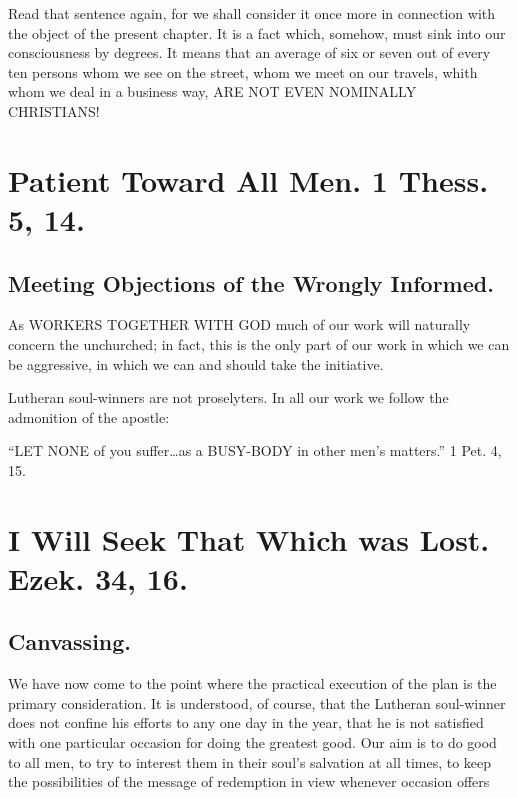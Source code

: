 \documentclass[
]{book}
\begin{document}
Read that sentence again, for we shall consider it once more in connection with the object of the present chapter. It is a fact which, somehow, must sink into our consciousness by degrees. It means that an average of six or seven out of every ten persons whom we see on the street, whom we meet on our travels, whith whom we deal in a business way, ARE NOT EVEN NOMINALLY CHRISTIANS!

\hypertarget{patient-toward-all-men.-1-thess.-5-14.}{%
\chapter{Patient Toward All Men. 1 Thess. 5, 14.}\label{patient-toward-all-men.-1-thess.-5-14.}}

\hypertarget{meeting-objections-of-the-wrongly-informed.}{%
\section*{Meeting Objections of the Wrongly Informed.}\label{meeting-objections-of-the-wrongly-informed.}}

As WORKERS TOGETHER WITH GOD much of our work will naturally concern the unchurched; in fact, this is the only part of our work in which we can be aggressive, in which we can and should take the initiative.

Lutheran soul-winners are not proselyters. In all our work we follow the admonition of the apostle:

``LET NONE of you suffer\ldots as a BUSY-BODY in other men's matters.'' 1 Pet. 4, 15.

\hypertarget{i-will-seek-that-which-was-lost.-ezek.-34-16.}{%
\chapter{I Will Seek That Which was Lost. Ezek. 34, 16.}\label{i-will-seek-that-which-was-lost.-ezek.-34-16.}}

\hypertarget{canvassing.}{%
\section*{Canvassing.}\label{canvassing.}}

We have now come to the point where the practical execution of the plan is the primary consideration. It is understood, of course, that the Lutheran soul-winner does not confine his efforts to any one day in the year, that he is not satisfied with one particular occasion for doing the greatest good. Our aim is to do good to all men, to try to interest them in their soul's salvation at all times, to keep the possibilities of the message of redemption in view whenever occasion offers
\end{document}

